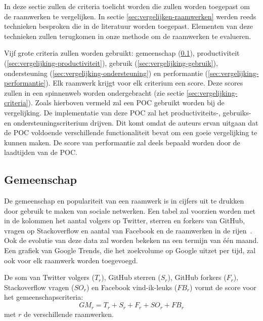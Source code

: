In deze sectie zullen de criteria toelicht worden die zullen worden toegepast om de raamwerken te vergelijken.
In sectie \ref{sec:vergelijken-raamwerken} werden reeds technieken besproken die in de literatuur worden toegepast.
Elementen van deze technieken zullen terugkomen in onze methode om de raamwerken te evalueren.


Vijf grote criteria zullen worden gebruikt: gemeenschap (\ref{sec:vergelijking-gemeenschap}), productiviteit (\ref{sec:vergelijking-productiviteit}), gebruik (\ref{sec:vergelijking-gebruik}), ondersteuning (\ref{sec:vergelijking-ondersteuning}) en performantie (\ref{sec:vergelijking-performantie}). 
Elk raamwerk krijgt voor elk criterium een score. 
Deze scores zullen in een spinnenweb worden ondergebracht (zie sectie \ref{sec:vergelijking-criteria}).
Zoals hierboven vermeld zal een POC gebruikt worden bij de vergelijking.
De implementatie van deze POC zal het productiviteits-, gebruiks- en ondersteuningscriterium drijven.  
Dit komt omdat de auteurs ervan uitgaan dat de POC voldoende verschillende functionaliteit bevat om een goeie vergelijking te kunnen maken.
De score van performantie zal deels bepaald worden door de laadtijden van de POC.

\subsection{Gemeenschap}
\label{sec:vergelijking-gemeenschap}
De gemeenschap en populariteit van een raamwerk is in cijfers uit te drukken door gebruik te maken van sociale netwerken. 
Een tabel zal voorzien worden met in de kolommen het aantal volgers op Twitter, sterren en forkers van GitHub,  vragen op Stackoverflow en aantal  van Facebook en de raamwerken in de rijen~\cite{Sarrafi2012a,Ayuso2012}. 
Ook de evolutie van deze data zal worden bekeken na een termijn van één maand.
Een grafiek van Google Trends, die het zoekvolume op Google uitzet per tijd, zal ook voor elk raamwerk worden toegevoegd.

De som van Twitter volgers ($T_r$), GitHub sterren ($S_r$), GitHub forkers ($F_r$), Stackoverflow vragen ($SO_r$) en Facebook vind-ik-leuks ($FB_r$) vormt de score voor het gemeenschapscriteria:
\begin{equation}
  GM_r=T_r+S_r+F_r+SO_r+FB_r
  \label{eq:gemeenschap}
\end{equation}
met $r$ de verschillende raamwerken.

